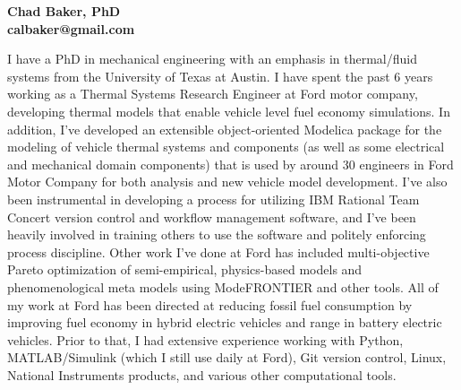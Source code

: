 \documentclass[11pt]{letter} %
\begin{document}

\begin{letter}{}


\begin{center}
\large\bf Chad Baker, PhD \\ %
calbaker@gmail.com %
\end{center} 
\vfill

\signature{Chad Baker} %


\opening{} I have a PhD in mechanical engineering with an emphasis in
thermal/fluid systems from the University of Texas at Austin.  I have
spent the past 6 years working as a Thermal Systems Research Engineer
at Ford motor company, developing thermal models that enable vehicle
level fuel economy simulations.  In addition, I've developed an
extensible object-oriented Modelica package for the modeling of
vehicle thermal systems and components (as well as some electrical and
mechanical domain components) that is used by around 30 engineers in
Ford Motor Company for both analysis and new vehicle model
development.  I've also been instrumental in developing a process for
utilizing IBM Rational Team Concert version control and workflow
management software, and I've been heavily involved in training others
to use the software and politely enforcing process discipline.  Other
work I've done at Ford has included multi-objective Pareto
optimization of semi-empirical, physics-based models and
phenomenological meta models using ModeFRONTIER and other tools.  All
of my work at Ford has been directed at reducing fossil fuel
consumption by improving fuel economy in hybrid electric vehicles and
range in battery electric vehicles.  Prior to that, I had extensive
experience working with Python, MATLAB/Simulink (which I still use
daily at Ford), Git version control, Linux, National Instruments
products, and various other computational tools.


\end{letter}
\end{document}
